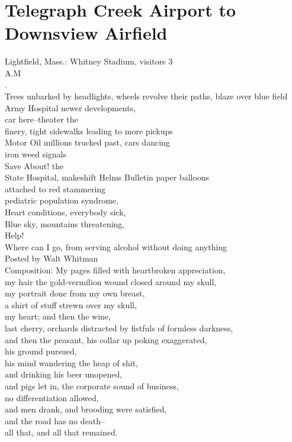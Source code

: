 \documentclass[smalldemyvopaper,11pt,twoside,onecolumn,openright,extrafontsizes]{memoir}
\begin{document}
\chapter{Telegraph Creek Airport to Downsview Airfield}
Lightfield, Mass.: Whitney Stadium, visitors 3
\\A.M
\\.
\\Trees unbarked by headlights, wheels revolve their paths, blaze over blue field
\\Army Hospital newer developments,
\\car here--theater the
\\finery, tight sidewalks leading to more pickups
\\Motor Oil millions trucked past, cars dancing
\\iron weed signals
\\Save About! the
\\State Hospital, makeshift Helms Bulletin paper balloons
\\attached to red stammering
\\pediatric population syndrome,
\\Heart conditions, everybody sick,
\\Blue sky, mountains threatening,
\\Help!
\\Where can I go, from serving alcohol without doing anything
\\Posted by Walt Whitman
\\Composition: My pages filled with heartbroken appreciation,
\\my hair the gold-vermilion wound closed around my skull,
\\my portrait done from my own breast,
\\a shirt of stuff strewn over my skull,
\\my heart; and then the wine,
\\last cherry, orchards distracted by fistfuls of formless darkness,
\\and then the peasant, his collar up poking exaggerated,
\\his ground pursued,
\\his mind wandering the heap of shit,
\\and drinking his beer unopened,
\\and pigs let in, the corporate sound of business,
\\no differentiation allowed,
\\and men drank, and brooding were satisfied,
\\and the road has no death--
\\all that, and all that remained.
\end{document}
